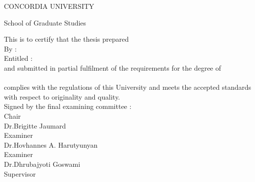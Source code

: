 \documentclass[11pt, a4paper, oneside]{Thesis} %
\begin{document}

\clearpage

\pagestyle{empty} %
  \vspace{1em}
     \begin{center}
        CONCORDIA UNIVERSITY
     \end{center}
     \begin{center}
        School of Graduate Studies
     \end{center}
     \vspace{3ex}
     This is to certify that the thesis prepared\\[2ex]
     By :\hspace{38pt}{\bf {\authornames}}\\[2ex]
     Entitled :\hspace*{13pt}{\bf \ttitle}\\[2ex] 
    and submitted in partial fulfilment of the requirements for the degree
    of\\[2ex]
    \hspace*{62pt}{\bf \degreename}\\[2ex]
    complies with the regulations of this University and meets the accepted
    standards with respect to originality and quality. \\[2ex]
    Signed by the final examining committee : \\[5ex]
    \hspace*{77pt}\underline{\hspace{234pt}} Chair\\
    \hspace*{77pt}Dr.\@ Brigitte Jaumard \\[2.5ex]
    \hspace*{77pt}\underline{\hspace{234pt}} Examiner\\
    \hspace*{77pt}Dr.\@ Hovhannes A. Harutyunyan \\[2.5ex]
    \hspace*{77pt}\underline{\hspace{234pt}} Examiner\\
    \hspace*{77pt}Dr.\@ Dhrubajyoti Goswami \\[2.5ex]
    \hspace*{77pt}\underline{\hspace{234pt}} Supervisor \\
\end{document}
